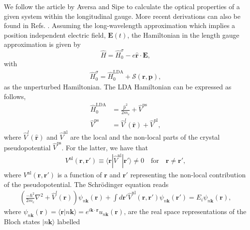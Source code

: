 We follow the article by Aversa and Sipe\cite{aversaPRB95} to calculate 
the optical properties of a given system within the longitudinal gauge. 
More recent derivations
can also be found in Refs. \cite{sipePRB00,lambrechtPSSB00}.  
Assuming the long-wavelength approximation which implies 
a position independent electric field, 
$\mathbf{E}(t)$,  
the Hamiltonian in the length gauge approximation is given by
\begin{equation}\label{ache}
\hat{H}=\hat{H}^{\sigma}_{0}-e \hat{\mathbf{r}} \cdot \mathbf{E},
\end{equation}
with
\begin{align}\label{ache.1}
\hat{H}^{\sigma}_{0}=\hat{H}^{\mathrm{LDA}}_{0}
 + \mathcal{S}(\mathbf{r},\mathbf{p})
,
\end{align} 
as the unperturbed Hamiltonian.
The LDA Hamiltonian can be expressed as follows,
\begin{align}\label{ache.2}
\hat{H}^{\mathrm{LDA}}_{0} &= \frac{\hat{p}^{2}}{2m_{e}} + \hat{V}^{\mathrm{ps}}
\nonumber\\
\hat{V}^{\mathrm{ps}} &= \hat{V}^{l}(\hat{\mathbf{r}}) + \hat{V}^{\mathrm{nl}}
,
\end{align}  
where $\hat{V}^{l}(\hat{\mathbf{r}})$ and $\hat{V}^{\mathrm{nl}}$ are the local and
the non-local parts of the  
crystal 
pseudopotential $\hat{V}^{\mathrm{ps}}$. For the latter, we have that
\begin{align}\label{ache.3n}
V^{\mathrm{nl}}(\mathbf{r},\mathbf{r}')
\equiv \langle\mathbf{r}|\hat{V}^{\mathrm{nl}}|\mathbf{r}'\rangle \neq 0 \quad\mathrm{for}\quad\mathbf{r} \neq \mathbf{r}'
,
\end{align}
where $V^{\mathrm{nl}}(\mathbf{r},\mathbf{r}')$ is a function of $\mathbf{r}$ and $\mathbf{r}'$
representing the non-local contribution of the pseudopotential.
The Schr\"odinger equation reads
\begin{align}\label{ache.4} 
\left(
\frac{-\hbar^2}{2m_{e}}\nabla^{2}
 + \hat{V}^l(\mathbf{r})\right)\psi_{n\mathbf{k}}(\mathbf{r})
 + \int d\mathbf{r}'\hat{V}^{\mathrm{nl}}(\mathbf{r},\mathbf{r}')\psi_{n\mathbf{k}}(\mathbf{r}')
=E_{i}\psi_{n\mathbf{k}}(\mathbf{r})
,
\end{align} 
where
$\psi_{n\mathbf{k}}(\mathbf{r}) = \langle\mathbf{r}|n\mathbf{k}\rangle = e^{i\mathbf{k}\cdot\mathbf{r}}u_{n\mathbf{k}}(\mathbf{r})$,
are the real space representations of the Bloch states $|n\mathbf{k}\rangle$ labelled
